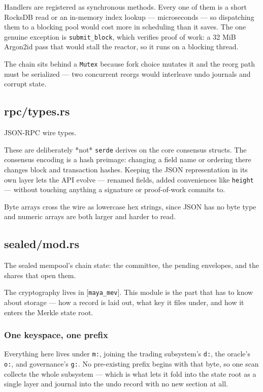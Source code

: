 \documentclass[11pt,a4paper]{article}
\begin{document}
Handlers are registered as synchronous methods. Every one of them is a short
RocksDB read or an in-memory index lookup — microseconds — so dispatching
them to a blocking pool would cost more in scheduling than it saves. The one
genuine exception is \texttt{submit\_block}, which verifies proof of work: a 32 MiB
Argon2id pass that would stall the reactor, so it runs on a blocking thread.

The chain sits behind a \texttt{Mutex} because fork choice mutates it and the reorg
path must be serialized — two concurrent reorgs would interleave undo
journals and corrupt state.

\subsection{rpc/types.rs}
JSON-RPC wire types.

These are deliberately *not* \texttt{serde} derives on the core consensus structs.
The consensus encoding is a hash preimage: changing a field name or ordering
there changes block and transaction hashes. Keeping the JSON representation
in its own layer lets the API evolve — renamed fields, added conveniences
like \texttt{height} — without touching anything a signature or proof-of-work
commits to.

Byte arrays cross the wire as lowercase hex strings, since JSON has no byte
type and numeric arrays are both larger and harder to read.

\subsection{sealed/mod.rs}
The sealed mempool's chain state: the committee, the pending envelopes, and
the shares that open them.

The cryptography lives in [\texttt{maya\_mev}]. This module is the part that has to
know about storage — how a record is laid out, what key it files under, and
how it enters the Merkle state root.

\subsubsection{One keyspace, one prefix}

Everything here lives under \texttt{m:}, joining the trading subsystem's \texttt{d:}, the
oracle's \texttt{o:}, and governance's \texttt{g:}. No pre-existing prefix begins with
that byte, so one scan collects the whole subsystem — which is what lets it
fold into the state root as a single layer and journal into the undo record
with no new section at all.
\end{document}
